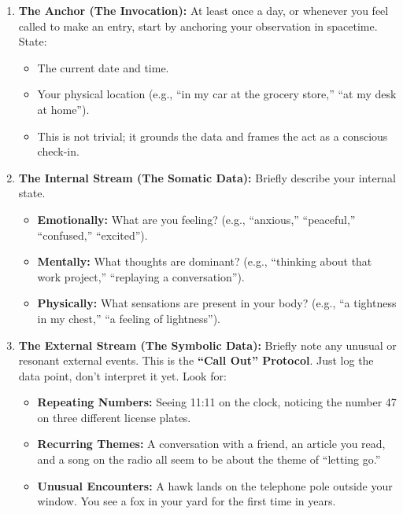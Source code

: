 \documentclass{article}
\begin{document}
\begin{enumerate}
\def\labelenumi{\arabic{enumi}.}
\tightlist
\item
  \textbf{The Anchor (The Invocation):} At least once a day, or whenever
  you feel called to make an entry, start by anchoring your observation
  in spacetime. State:

  \begin{itemize}
  \tightlist
  \item
    The current date and time.
  \item
    Your physical location (e.g., ``in my car at the grocery store,''
    ``at my desk at home'').
  \item
    This is not trivial; it grounds the data and frames the act as a
    conscious check-in.
  \end{itemize}
\item
  \textbf{The Internal Stream (The Somatic Data):} Briefly describe your
  internal state.

  \begin{itemize}
  \tightlist
  \item
    \textbf{Emotionally:} What are you feeling? (e.g., ``anxious,''
    ``peaceful,'' ``confused,'' ``excited'').
  \item
    \textbf{Mentally:} What thoughts are dominant? (e.g., ``thinking
    about that work project,'' ``replaying a conversation'').
  \item
    \textbf{Physically:} What sensations are present in your body?
    (e.g., ``a tightness in my chest,'' ``a feeling of lightness'').
  \end{itemize}
\item
  \textbf{The External Stream (The Symbolic Data):} Briefly note any
  unusual or resonant external events. This is the \textbf{``Call Out''
  Protocol}. Just log the data point, don't interpret it yet. Look for:

  \begin{itemize}
  \tightlist
  \item
    \textbf{Repeating Numbers:} Seeing 11:11 on the clock, noticing the
    number 47 on three different license plates.
  \item
    \textbf{Recurring Themes:} A conversation with a friend, an article
    you read, and a song on the radio all seem to be about the theme of
    ``letting go.''
  \item
    \textbf{Unusual Encounters:} A hawk lands on the telephone pole
    outside your window. You see a fox in your yard for the first time
    in years.
  \end{itemize}
\end{enumerate}
\end{document}
